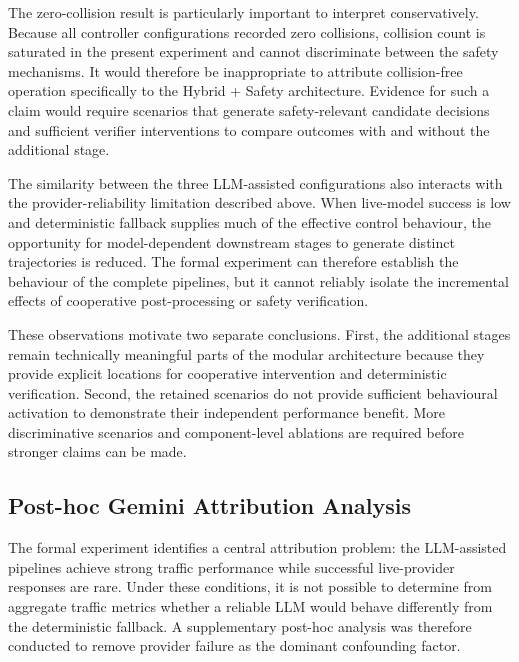 \documentclass[letterpaper,10pt,conference]{ieeeconf}
\begin{document}
The zero-collision result is particularly important to interpret conservatively. Because all controller configurations recorded zero collisions, collision count is saturated in the present experiment and cannot discriminate between the safety mechanisms. It would therefore be inappropriate to attribute collision-free operation specifically to the Hybrid + Safety architecture. Evidence for such a claim would require scenarios that generate safety-relevant candidate decisions and sufficient verifier interventions to compare outcomes with and without the additional stage.



The similarity between the three LLM-assisted configurations also interacts with the provider-reliability limitation described above. When live-model success is low and deterministic fallback supplies much of the effective control behaviour, the opportunity for model-dependent downstream stages to generate distinct trajectories is reduced. The formal experiment can therefore establish the behaviour of the complete pipelines, but it cannot reliably isolate the incremental effects of cooperative post-processing or safety verification.



These observations motivate two separate conclusions. First, the additional stages remain technically meaningful parts of the modular architecture because they provide explicit locations for cooperative intervention and deterministic verification. Second, the retained scenarios do not provide sufficient behavioural activation to demonstrate their independent performance benefit. More discriminative scenarios and component-level ablations are required before stronger claims can be made.



\subsection{Post-hoc Gemini Attribution Analysis}



The formal experiment identifies a central attribution problem: the LLM-assisted pipelines achieve strong traffic performance while successful live-provider responses are rare. Under these conditions, it is not possible to determine from aggregate traffic metrics whether a reliable LLM would behave differently from the deterministic fallback. A supplementary post-hoc analysis was therefore conducted to remove provider failure as the dominant confounding factor.
\end{document}
